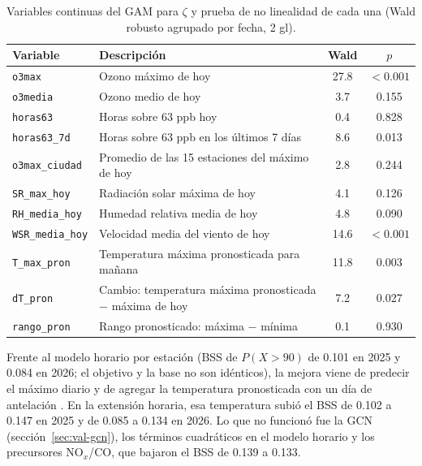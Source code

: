 \documentclass[11pt]{article}
\begin{document}
\begin{table}[!htbp]
\centering
\caption{Variables continuas del GAM para $\zeta$ y prueba de no linealidad de cada una (Wald robusto agrupado por fecha, 2 gl).}
\label{tab:variables}
\small
\begin{tabular}{@{}p{3.1cm}p{7.4cm}cc@{}}
\toprule
Variable & Descripción & Wald & $p$ \\
\midrule
\texttt{o3max}        & Ozono máximo de hoy                                  & 27.8 & $<0.001$ \\
\texttt{o3media}      & Ozono medio de hoy                                   & 3.7  & 0.155 \\
\texttt{horas63}      & Horas sobre 63 ppb hoy                               & 0.4  & 0.828 \\
\texttt{horas63\_7d}  & Horas sobre 63 ppb en los últimos 7 días             & 8.6  & 0.013 \\
\texttt{o3max\_ciudad}& Promedio de las 15 estaciones del máximo de hoy      & 2.8  & 0.244 \\
\midrule
\texttt{SR\_max\_hoy} & Radiación solar máxima de hoy                        & 4.1  & 0.126 \\
\texttt{RH\_media\_hoy}& Humedad relativa media de hoy                       & 4.8  & 0.090 \\
\texttt{WSR\_media\_hoy}& Velocidad media del viento de hoy                  & 14.6 & $<0.001$ \\
\midrule
\texttt{T\_max\_pron} & Temperatura máxima pronosticada para mañana          & 11.8 & 0.003 \\
\texttt{dT\_pron}     & Cambio: temperatura máxima pronosticada $-$ máxima de hoy & 7.2 & 0.027 \\
\texttt{rango\_pron}  & Rango pronosticado: máxima $-$ mínima                & 0.1  & 0.930 \\
\bottomrule
\end{tabular}
\end{table}

Frente al modelo horario por estación (BSS de $P(X>90)$ de 0.101 en 2025 y 0.084 en 2026; el objetivo y la base no son idénticos), la mejora viene de predecir el máximo diario y de agregar la temperatura pronosticada con un día de antelación \citep{zippenfenig_open_meteo_2023}. En la extensión horaria, esa temperatura subió el BSS de 0.102 a 0.147 en 2025 y de 0.085 a 0.134 en 2026. Lo que no funcionó fue la GCN (sección~\ref{sec:val-gcn}), los términos cuadráticos en el modelo horario y los precursores NO$_x$/CO, que bajaron el BSS de 0.139 a 0.133.
\end{document}
